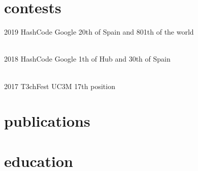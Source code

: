\documentclass{friggeri-cv}
\newcommand{\myhref}[2]{\href[pdfnewwindow=true]{#1}{#2}}
\newcommand{\UVa}{\myhref{http://www.uva.es}{University of Valladolid}}
\begin{document}


  \section{contests}

    \begin{entrylist}

      \entry
      {2019}
      {HashCode}
      {Google}
      {20th of Spain and 801th of the world}

      \\
      \entry
      {2018}
      {HashCode}
      {Google}
      {1th of Hub and 30th of Spain}

      \\
      \entry
      {2017}
      {T3chFest}
      {UC3M}
      {17th position}

    \end{entrylist}



  \section{publications}




  \section{education}
\end{document}
